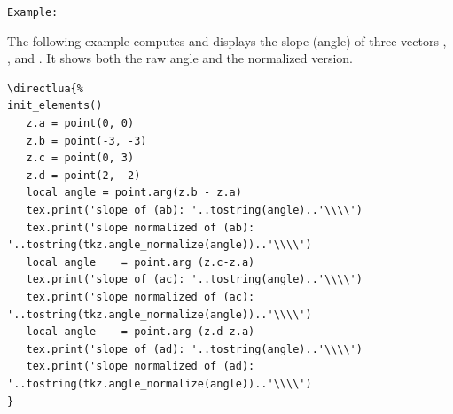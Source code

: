 \medskip
\texttt{Example: }

The following example computes and displays the slope (angle) of three vectors , , and . It shows both the raw angle and the normalized version.
\begin{Verbatim}
\directlua{%
init_elements()
   z.a = point(0, 0)
   z.b = point(-3, -3)
   z.c = point(0, 3)
   z.d = point(2, -2)
   local angle = point.arg(z.b - z.a)
   tex.print('slope of (ab): '..tostring(angle)..'\\\\')
   tex.print('slope normalized of (ab): '..tostring(tkz.angle_normalize(angle))..'\\\\')
   local angle    = point.arg (z.c-z.a)
   tex.print('slope of (ac): '..tostring(angle)..'\\\\')
   tex.print('slope normalized of (ac): '..tostring(tkz.angle_normalize(angle))..'\\\\')
   local angle    = point.arg (z.d-z.a)
   tex.print('slope of (ad): '..tostring(angle)..'\\\\')
   tex.print('slope normalized of (ad): '..tostring(tkz.angle_normalize(angle))..'\\\\')
}
\end{Verbatim}

